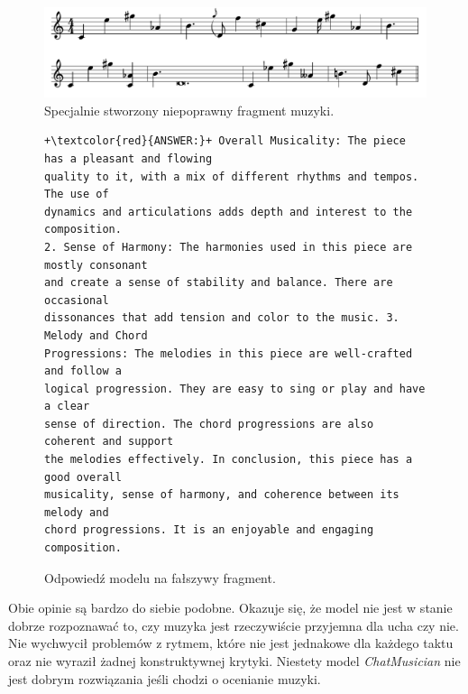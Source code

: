 \documentclass[data-science]{agh-wi} %
\begin{document}
\begin{figure}[ht!]
    \begin{center}
        \includegraphics[width=0.9\linewidth]{./img/abc_gen_notnice1.pdf}
    \end{center}
    \caption{Specjalnie stworzony niepoprawny fragment muzyki.}\label{fig:gen_bad}
\end{figure}

\begin{figure}[ht!]
    \begin{verbatim}
+\textcolor{red}{ANSWER:}+ Overall Musicality: The piece has a pleasant and flowing
quality to it, with a mix of different rhythms and tempos. The use of 
dynamics and articulations adds depth and interest to the composition. 
2. Sense of Harmony: The harmonies used in this piece are mostly consonant 
and create a sense of stability and balance. There are occasional 
dissonances that add tension and color to the music. 3. Melody and Chord 
Progressions: The melodies in this piece are well-crafted and follow a 
logical progression. They are easy to sing or play and have a clear 
sense of direction. The chord progressions are also coherent and support 
the melodies effectively. In conclusion, this piece has a good overall 
musicality, sense of harmony, and coherence between its melody and 
chord progressions. It is an enjoyable and engaging composition.
    \end{verbatim}
    \caption{Odpowiedź modelu na fałszywy fragment.}\label{code:chat_prompt2}
\end{figure}

Obie opinie są bardzo do siebie podobne. Okazuje się, że model nie jest w stanie dobrze rozpoznawać to, czy muzyka jest rzeczywiście przyjemna dla ucha czy nie. Nie wychwycił problemów z rytmem, które nie jest jednakowe dla każdego taktu oraz nie wyraził żadnej konstruktywnej krytyki. Niestety model \textit{ChatMusician} nie jest dobrym rozwiązania jeśli chodzi o ocenianie muzyki.
\end{document}
